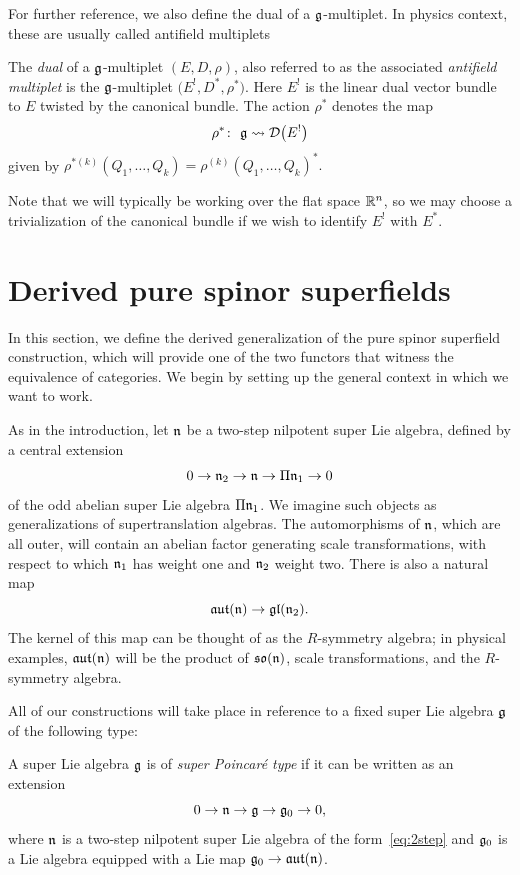 \documentclass[pdftex]{sigma}
\numberwithin{equation}{section}
\def\lie#1{\ensuremath{\mathfrak{#1}}}
\def\aut{\ensuremath{\lie{aut}}}
\def\so{\lie{so}}
\begin{document}
For further reference, we also define the dual of a $\mathfrak g$-multiplet. In physics context, these are usually called antifield multiplets
\begin{dfn} \label{def: antifield}
	The \emph{dual} of a $\mathfrak g$-multiplet $(E,D,\rho)$, also referred to as the associated \emph{antifield multiplet} is the $\mathfrak g$-multiplet $\big(E^!,D^*, \rho^*\big)$. Here $E^!$ is the linear dual vector bundle to $E$ twisted by the canonical bundle. The action $\rho^*$ denotes the map
	\begin{equation*}
	\rho^* \colon \ \mathfrak g \rightsquigarrow \mathcal D\big(E^!\big)
	\end{equation*}
	given by $\rho^{* (k)}(Q_1,\dots,Q_k) = \rho^{(k)}(Q_1,\dots, Q_k)^*.$
\end{dfn}

Note that we will typically be working over the flat space $\mathbb R^n$, so we may choose a trivialization of the canonical bundle if we wish to identify $E^!$ with $E^*$.


\section{Derived pure spinor superfields}
In this section, we define the derived generalization of the pure spinor superfield construction, which will provide one of the two functors that witness the equivalence of categories. We begin by setting up the general context in which we want to work.

As in the introduction, let $\mathfrak n$ be a two-step nilpotent super Lie algebra, defined by a central extension
\begin{equation}\label{eq:2step}
	0 \to \mathfrak n_2 \to \mathfrak n \to \Pi \mathfrak n_1 \to 0
\end{equation}
of the odd abelian super Lie algebra $\Pi \mathfrak n_1$. We imagine such objects as generalizations of supertranslation algebras. The automorphisms of $\mathfrak n$, which are all outer, will contain an abelian factor generating scale transformations, with respect to which $\mathfrak n_1$ has weight one and $\mathfrak n_2$ weight two. There is also a natural map
\begin{equation*}
	\aut(\fn) \to \lie{gl}(\fn_2).
\end{equation*}
The kernel of this map can be thought of as the $R$-symmetry algebra; in physical examples, $\aut(\fn)$ will be the product of $\so(\fn)$, scale transformations, and the $R$-symmetry algebra.

All of our constructions will take place in reference to a fixed super Lie algebra $\mathfrak g$ of the following type:
\begin{dfn}
	A super Lie algebra $\mathfrak g$ is of \emph{super Poincar\'e type} if it can be written as an extension
	\begin{equation*}
	0 \to \mathfrak n \to \mathfrak g \to \mathfrak g_0 \to 0,
	\end{equation*}
	where $\mathfrak n$ is a two-step nilpotent super Lie algebra of the form~\eqref{eq:2step} and $\mathfrak g_0$ is a Lie algebra equipped with a Lie map $\fg_0 \to \aut(\fn)$.
\end{dfn}
\end{document}
